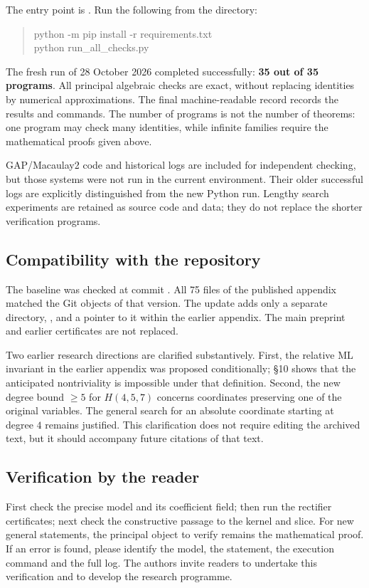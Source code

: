 The entry point is .
Run the following from the  directory:
\begin{quote}\ttfamily\small
python -m pip install -r requirements.txt\\
python run\_all\_checks.py
\end{quote}
The fresh run of 28 October 2026 completed successfully: \textbf{35 out of 35
programs}. All principal algebraic checks are exact, without replacing
identities by numerical approximations. The final machine-readable record
 records the results and commands.
The number of programs is not the number of theorems: one program may
check many identities, while infinite families require the mathematical
proofs given above.

GAP/Macaulay2 code and historical logs are included for independent
checking, but those systems were not run in the current environment.
Their older successful logs are explicitly distinguished from the new Python run.
Lengthy search experiments are retained as source code and data;
they do not replace the shorter verification programs.

\subsection*{Compatibility with the repository}
The baseline was checked at commit
.
All 75 files of the published appendix matched the Git objects of that
version. The update adds only a separate directory,
, and a pointer to it within the earlier
appendix. The main preprint and earlier certificates are not replaced.

Two earlier research directions are clarified substantively.
First, the relative ML invariant in the earlier appendix was proposed
conditionally; \S10 shows that the anticipated nontriviality is impossible
under that definition. Second, the new degree bound $\ge5$ for $H(4,5,7)$
concerns coordinates preserving one of the original variables.
The general search for an absolute coordinate starting at degree $4$ remains
justified. This clarification does not require editing the archived text,
but it should accompany future citations of that text.

\subsection*{Verification by the reader}
First check the precise model and its coefficient field; then run the
rectifier certificates; next check the constructive passage to the kernel
and slice. For new general statements, the principal object to verify
remains the mathematical proof. If an error is found, please identify the model,
the statement, the execution command and the full log. The authors invite
readers to undertake this verification and to develop the research programme.
